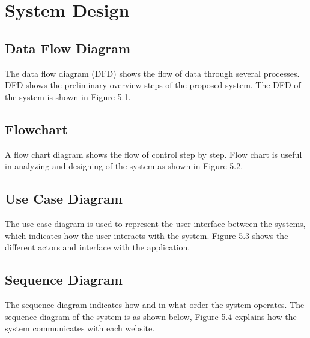 \documentclass[12pt,a4paper]{report}
\begin{document}
\newpage
\chapter{System Design}
\section{Data Flow Diagram}
The data flow diagram (DFD) shows the flow of data through several processes. DFD shows the preliminary overview steps of the proposed system. The DFD of the system is shown in Figure 5.1.


\newpage
\section{Flowchart}
A flow chart diagram shows the flow of control step by step. Flow chart is useful in analyzing and designing of the system as shown in Figure 5.2.  


\newpage
\section{Use Case Diagram}
The use case diagram is used to represent the user interface between the systems, which indicates how the user interacts with the system. Figure 5.3 shows the different actors and interface with the application.


\newpage
\section{Sequence Diagram}
The sequence diagram indicates how and in what order the system operates. The sequence diagram of the system is as shown below, Figure 5.4 explains how the system communicates with each website. 
\end{document}
